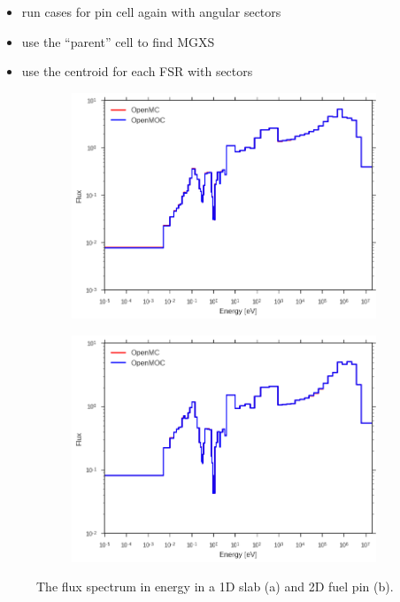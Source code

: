 \begin{itemize}
  \item run cases for pin cell again with angular sectors
  \item use the ``parent'' cell to find MGXS
  \item use the centroid for each FSR with sectors
\end{itemize}

\begin{figure}[H]
\begin{subfigure}{.5\textwidth}
  \centering
  \includegraphics[width=\linewidth]{figures/biases/slab/vol-avg-flux}
  \caption{}
\end{subfigure}
\begin{subfigure}{.5\textwidth}
  \centering
  \includegraphics[width=\linewidth]{figures/biases/pin-cell/vol-avg-flux}
  \caption{}
\end{subfigure}
\caption[Flux spectrum in a slab and pin cell]{The flux spectrum in energy in a 1D slab (a) and 2D fuel pin (b).}
\label{fig:chap4-slab-flux}
\end{figure}

